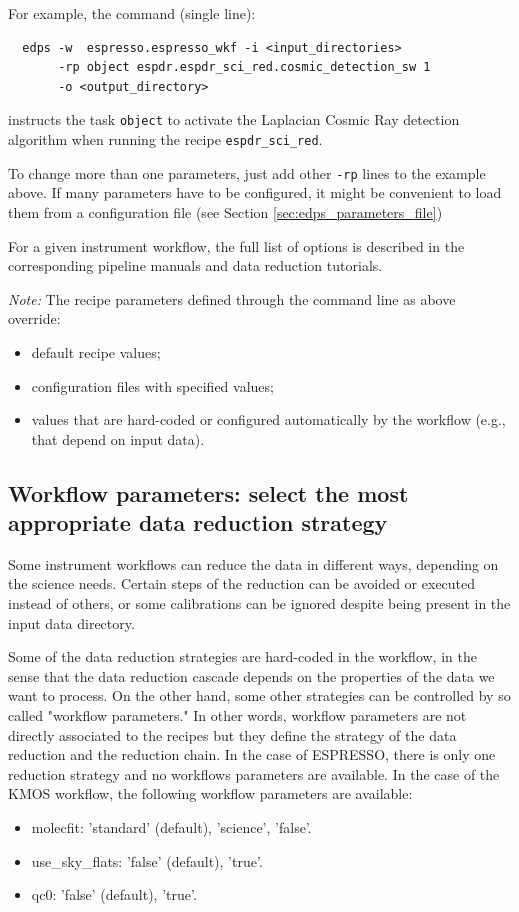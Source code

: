 For example, the command (single line):

\begin{verbatim}
  edps -w  espresso.espresso_wkf -i <input_directories> 
       -rp object espdr.espdr_sci_red.cosmic_detection_sw 1
       -o <output_directory>
 \end{verbatim}
 
instructs the task {\tt object} to activate the Laplacian Cosmic Ray detection algorithm when running the recipe {\tt espdr\_sci\_red}.

To change more than one parameters, just add other {\tt -rp} lines to the example above. If many parameters have to be configured, it might be convenient to load them from a configuration file (see Section \ref{sec:edps_parameters_file})

For a given instrument workflow, the full list of options is described in the corresponding pipeline manuals and data reduction tutorials.

{\it Note:} The recipe parameters defined through the command line as above override:
\begin{itemize}
    \item default recipe values;
    \item configuration files with specified values;
    \item values that are hard-coded or configured automatically by the workflow (e.g., that depend on input data).
\end{itemize}


\subsection{Workflow parameters: select the most appropriate data reduction strategy}
\label{sec:edps_workflow_parameters}

Some instrument workflows can reduce the data in different ways, depending on the science needs. Certain steps of the reduction can be avoided or executed instead of others, or some calibrations can be ignored despite being present in the input data directory. 

Some of the data reduction strategies are hard-coded in the workflow, in the sense that the data reduction cascade depends on the properties of the data we want to process. On the other hand, some other strategies can be controlled by so called "workflow parameters." In other words, workflow parameters are not directly associated to the recipes but they define the strategy of the data reduction and the reduction chain.
In the case of ESPRESSO, there is only one reduction strategy and no workflows parameters are available. In the case of the KMOS workflow, the following workflow parameters are available:
\begin{itemize}
    \item molecfit: 'standard' (default), 'science', 'false'.
    \item use\_sky\_flats: 'false' (default), 'true'.
    \item qc0: 'false' (default), 'true'.
\end{itemize}


